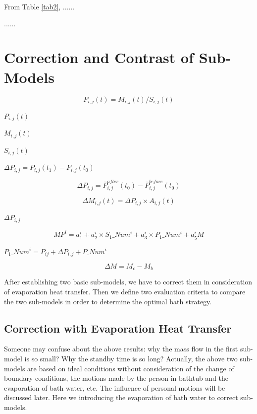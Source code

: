 \documentclass{mcmthesis}
\begin{document}
From Table \ref{tab2}, ......

......

\section{Correction and Contrast of Sub-Models}

\begin{equation}
P_{i, j}(t) = M_{i, j}(t) / S_{i, j}(t)
\end{equation}

$P_{i, j}(t)$

$M_{i, j}(t)$

$S_{i, j}(t)$

$\Delta P_{i, j} = P_{i, j}(t_{1}) - P_{i, j}(t_{0})$

\begin{equation}
\Delta P_{i, j} = \bar{P}_{i, j}^{after}(t_{0}) - \bar{P}_{i, j}^{before}(t_{0})
\end{equation}

\begin{equation}
\Delta M_{i, j}(t) = \Delta P_{i, j} \times A_{i, j}(t)
\end{equation}

$\Delta P_{i, j}$

\begin{equation}
MP^{i} = a_{1} ^ {i} + a_{2} ^{i}\times S_{1}\_Num^{i} + a_{3}^{i}\times P_{1}\_Num^{i} + a_{5}^{i}M
\end{equation}

$P_{1}\_Num^{i}=P_{ij} + \Delta P_{i, j} + P\_Num^{i}$

\begin{equation}
\Delta M=M_{c} - M_{b}
\end{equation}

After establishing two basic sub-models, we have to correct them in consideration of evaporation heat transfer. Then we define two evaluation criteria to compare the two sub-models in order to determine the optimal bath strategy.

\subsection{Correction with Evaporation Heat Transfer}

Someone may confuse about the above results: why the mass flow in the first sub-model is so small? Why the standby time is so long? Actually, the above two sub-models are based on ideal conditions without consideration of the change of boundary conditions, the motions made by the person in bathtub and the evaporation of bath water, etc. The influence of personal motions will be discussed later. Here we introducing the evaporation of bath water to correct sub-models.
\end{document}
